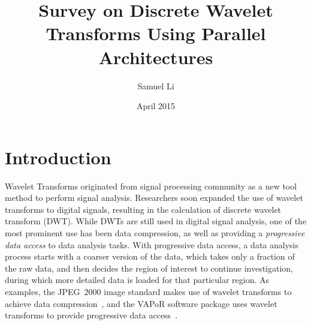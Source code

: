 \documentclass{article}
\title{Survey on Discrete Wavelet Transforms Using Parallel Architectures}
\author{Samuel Li}
\date{April 2015}
\begin{document}
\onehalfspacing

\maketitle

%
%
%
%
%
%

\section{Introduction}
%
Wavelet Transforms originated from signal processing community as a new 
tool method to perform signal analysis.
%
Researchers soon expanded the use of wavelet transforms to digital signals,
resulting in the calculation of discrete wavelet transform (DWT).
%
While DWTs are still used in digital signal analysis, one of the most 
prominent use has been data compression, as well as providing a
\textit{progressive data access} to data analysis tasks.
%
With progressive data access, a data analysis process starts with a coarser
version of the data, which takes only a fraction of the raw data, 
and then decides the region of interest to continue investigation, during
which more detailed data is loaded for that particular region.
%
As examples, the JPEG~2000 image standard makes use of wavelet
transforms to achieve data compression~\cite{skodras2001jpeg},
and the VAPoR software package uses wavelet transforms to provide
progressive data access~\cite{clyne2003multiresolution}.
\end{document}
